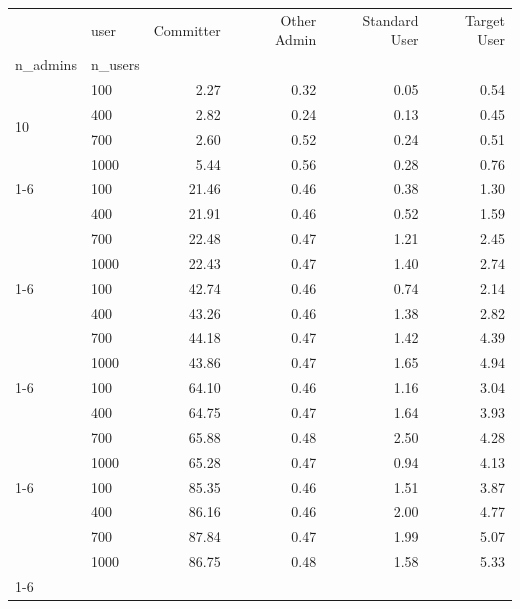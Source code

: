 \begin{tabular}{llrrrr}
\toprule
 & user & Committer & Other Admin & Standard User & Target User \\
n_admins & n_users &  &  &  &  \\
\midrule
\multirow[t]{4}{*}{10} & 100 & 2.27 & 0.32 & 0.05 & 0.54 \\
                        & 400 & 2.82 & 0.24 & 0.13 & 0.45 \\
                        & 700 & 2.60 & 0.52 & 0.24 & 0.51 \\
                        & 1000 & 5.44 & 0.56 & 0.28 & 0.76 \\
\cline{1-6}
\multirow[t]{4}{*}{50} & 100 & 21.46 & 0.46 & 0.38 & 1.30 \\
                        & 400 & 21.91 & 0.46 & 0.52 & 1.59 \\
                        & 700 & 22.48 & 0.47 & 1.21 & 2.45 \\
                        & 1000 & 22.43 & 0.47 & 1.40 & 2.74 \\
\cline{1-6}
\multirow[t]{4}{*}{100} & 100 & 42.74 & 0.46 & 0.74 & 2.14 \\
                        & 400 & 43.26 & 0.46 & 1.38 & 2.82 \\
                        & 700 & 44.18 & 0.47 & 1.42 & 4.39 \\
                        & 1000 & 43.86 & 0.47 & 1.65 & 4.94 \\
    \cline{1-6}
\multirow[t]{4}{*}{150} & 100 & 64.10 & 0.46 & 1.16 & 3.04 \\
                        & 400 & 64.75 & 0.47 & 1.64 & 3.93 \\
                        & 700 & 65.88 & 0.48 & 2.50 & 4.28 \\
                        & 1000 & 65.28 & 0.47 & 0.94 & 4.13 \\
\cline{1-6}
\multirow[t]{4}{*}{200} & 100 & 85.35 & 0.46 & 1.51 & 3.87 \\
                        & 400 & 86.16 & 0.46 & 2.00 & 4.77 \\
                        & 700 & 87.84 & 0.47 & 1.99 & 5.07 \\
                        & 1000 & 86.75 & 0.48 & 1.58 & 5.33 \\
\cline{1-6}
\bottomrule
\end{tabular}
